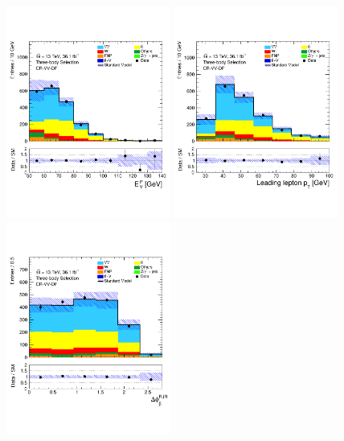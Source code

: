 \begin{figure}[!htb]
    \begin{center}
        \includegraphics[width=0.48\textwidth]{figures/search_stop2l/bkg_est/crvdf/crv_MDR}
        \includegraphics[width=0.48\textwidth]{figures/search_stop2l/bkg_est/crvdf/crv_l_pt0}
        \includegraphics[width=0.48\textwidth]{figures/search_stop2l/bkg_est/crvdf/crv_DPB_vSS}

\end{center}
\end{figure}
